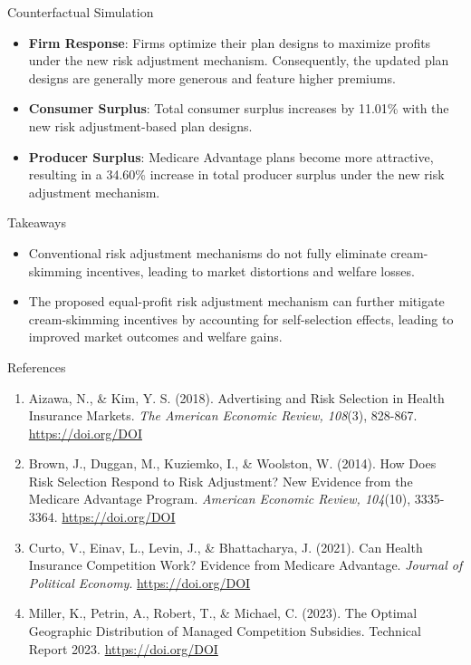 \documentclass{beamer}
\begin{document}
\begin{frame}[t]
\begin{columns}[t]
\begin{column}{.25 \textwidth}
\begin{block}{Counterfactual Simulation}
        \begin{itemize}
          \item \textbf{Firm Response}: Firms optimize their plan designs to maximize profits under the new risk adjustment mechanism. Consequently, the updated plan designs are generally more generous and feature higher premiums.
          \item \textbf{Consumer Surplus}: Total consumer surplus increases by 11.01\% with the new risk adjustment-based plan designs.
          \item \textbf{Producer Surplus}: Medicare Advantage plans become more attractive, resulting in a 34.60\% increase in total producer surplus under the new risk adjustment mechanism.
        \end{itemize}     
      \end{block}
      \begin{block}{Takeaways}
        \begin{itemize}
          \item Conventional risk adjustment mechanisms do not fully eliminate cream-skimming incentives, leading to market distortions and welfare losses.
          \item The proposed equal-profit risk adjustment mechanism can further mitigate cream-skimming incentives by accounting for self-selection effects, leading to improved market outcomes and welfare gains.
        \end{itemize}
      \end{block}
      \begin{block}{References}
        \begin{enumerate}
          \item Aizawa, N., \& Kim, Y. S. (2018). Advertising and Risk Selection in Health Insurance Markets. \textit{The American Economic Review, 108}(3), 828-867. \href{https://doi.org/DOI}{https://doi.org/DOI}
          \item Brown, J., Duggan, M., Kuziemko, I., \& Woolston, W. (2014). How Does Risk Selection Respond to Risk Adjustment? New Evidence from the Medicare Advantage Program. \textit{American Economic Review, 104}(10), 3335-3364. \href{https://doi.org/DOI}{https://doi.org/DOI}
          \item Curto, V., Einav, L., Levin, J., \& Bhattacharya, J. (2021). Can Health Insurance Competition Work? Evidence from Medicare Advantage. \textit{Journal of Political Economy}. \href{https://doi.org/DOI}{https://doi.org/DOI}
          \item Miller, K., Petrin, A., Robert, T., \& Michael, C. (2023). The Optimal Geographic Distribution of Managed Competition Subsidies. Technical Report 2023. \href{https://doi.org/DOI}{https://doi.org/DOI}
      \end{enumerate}
      \end{block}


    \end{column}
  
  \end{columns}
\end{frame}
\end{document}
